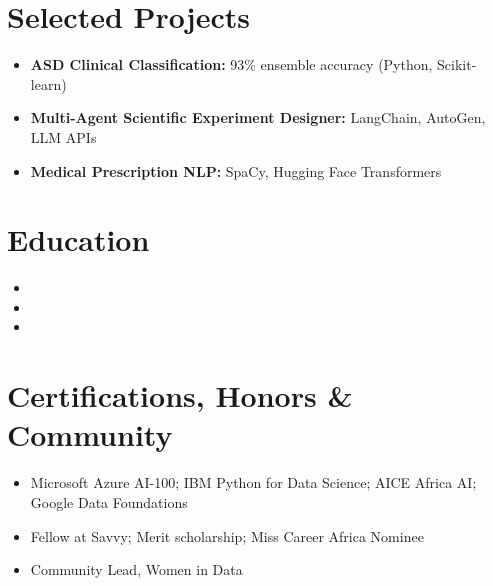 \documentclass[11pt,a4paper,sans]{moderncv}
\begin{document}
\section{Selected Projects}
\vspace{2pt}
\begin{itemize}
\item \textbf{ASD Clinical Classification:} 93\% ensemble accuracy (Python, Scikit-learn)
\item \textbf{Multi-Agent Scientific Experiment Designer:} LangChain, AutoGen, LLM APIs
\item \textbf{Medical Prescription NLP:} SpaCy, Hugging Face Transformers
\end{itemize}

\section{Education}
\vspace{1pt}
\begin{itemize}
\item{}
\item{}
\item{}
\end{itemize}

\section{Certifications, Honors \& Community}
\vspace{1pt}
\begin{itemize}
\item Microsoft Azure AI-100; IBM Python for Data Science; AICE Africa AI; Google Data Foundations
\item Fellow at Savvy; Merit scholarship; Miss Career Africa Nominee
\item Community Lead, Women in Data
\end{itemize}
\end{document}

